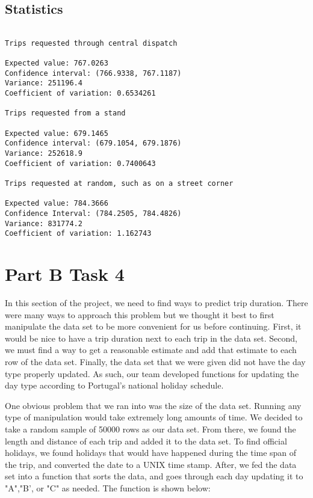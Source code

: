 \documentclass{article}
\begin{document}
\subsection{Statistics}

\begin{lstlisting}

Trips requested through central dispatch

Expected value: 767.0263
Confidence interval: (766.9338, 767.1187)
Variance: 251196.4
Coefficient of variation: 0.6534261

Trips requested from a stand

Expected value: 679.1465
Confidence interval: (679.1054, 679.1876)
Variance: 252618.9
Coefficient of variation: 0.7400643

Trips requested at random, such as on a street corner

Expected value: 784.3666
Confidence Interval: (784.2505, 784.4826)
Variance: 831774.2
Coefficient of variation: 1.162743
\end{lstlisting}






\section{Part B Task 4}
In this section of the project, we need to find ways to predict trip duration. There were many ways to approach this problem but we thought it best to first manipulate the data set to be more convenient for us before continuing. First, it would be nice to have a trip duration next to each trip in the data set. Second, we must find a way to get a reasonable estimate and add that estimate to each row of the data set. Finally, the data set that we were given did not have the day type properly updated. As such, our team developed functions for updating the day type according to Portugal's national holiday schedule.

One obvious problem that we ran into was the size of the data set. Running any type of manipulation would take extremely long amounts of time. We decided to take a random sample of 50000 rows as our data set. From there, we found the length and distance of each trip and added it to the data set. To find official holidays, we found holidays that would have happened during the time span of the trip, and converted the date to a UNIX time stamp. After, we fed the data set into a function that sorts the data, and goes through each day updating it to "A","B', or "C" as needed. The function is shown below:
\end{document}
